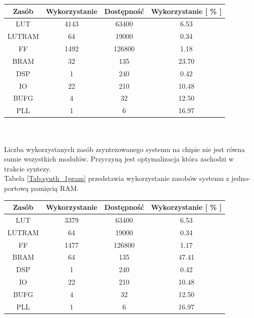\documentclass[11pt,a4paper]{article}
\begin{document}
\begin{minipage}[c]{\textwidth}
		 \begin{center}
				\begin{tabular}{|c|c|c|c|}
					\hline
					Zasób & Wykorzystanie & Dostępność & Wykorzystanie [ \% ] \\ 
					\hline
					LUT & 4143 & 63400 & 6.53  \\
					\hline
					LUTRAM & 64 & 19000 & 0.34  \\
					\hline
					FF & 1492 & 126800 & 1.18 \\
					\hline
					BRAM & 32 & 135 & 23.70 \\
					\hline
					DSP & 1 & 240 & 0.42 \\
					\hline
					IO & 22 & 210 & 10.48 \\
					\hline
					BUFG & 4 & 32 & 12.50 \\
					\hline
					PLL & 1 & 6 & 16.97 \\
					\hline															
				\end{tabular}
		\end{center}
\end{minipage}\\
\\
Liczba wykorzystanych zasób zsyntezowanego systemu na chipie nie jest równa sumie wszystkich modułów. Przyczyną jest optymalizacja która zachodzi w trakcie syntezy.\\
Tabela \ref{Tab:synth_1pram} przedstawia wykorzystanie zasobów systemu z jedno-portową pamięcią RAM.\\
\begin{minipage}[c]{\textwidth}
		 \begin{center}
				\begin{tabular}{|c|c|c|c|}
					\hline
					Zasób & Wykorzystanie & Dostępność & Wykorzystanie [ \% ] \\ 
					\hline
					LUT & 3379 & 63400 & 6.53  \\
					\hline
					LUTRAM & 64 & 19000 & 0.34  \\
					\hline
					FF & 1477 & 126800 & 1.17 \\
					\hline
					BRAM & 64 & 135 & 47.41 \\
					\hline
					DSP & 1 & 240 & 0.42 \\
					\hline
					IO & 22 & 210 & 10.48 \\
					\hline
					BUFG & 4 & 32 & 12.50 \\
					\hline
					PLL & 1 & 6 & 16.97 \\
					\hline																			\end{tabular}
		\end{center}
\end{minipage}\\
\end{document}
